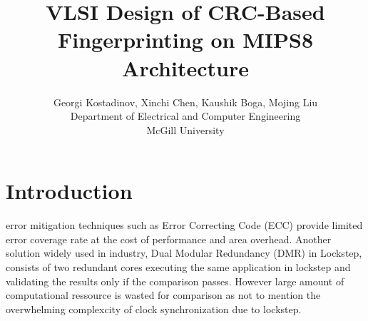 \documentclass[12pt,journal,compsoc]{IEEEtran}
\begin{document}
\title{VLSI Design of CRC-Based Fingerprinting on MIPS8 Architecture}

\author{Georgi Kostadinov, Xinchi Chen, Kaushik Boga, Mojing Liu
\\Department of Electrical and Computer Engineering 
\\McGill University}






\maketitle






\section{Introduction}
 error mitigation techniques such as Error Correcting Code (ECC) provide limited
error coverage rate at the cost of performance and area overhead. Another solution widely
used in industry,  Dual Modular Redundancy (DMR) in Lockstep, consists of two
redundant cores executing the same application in lockstep and validating the results only if
the comparison passes. However large amount of computational ressource is wasted for comparison
as not to mention the overwhelming complexcity of clock synchronization due to lockstep.
\end{document}
